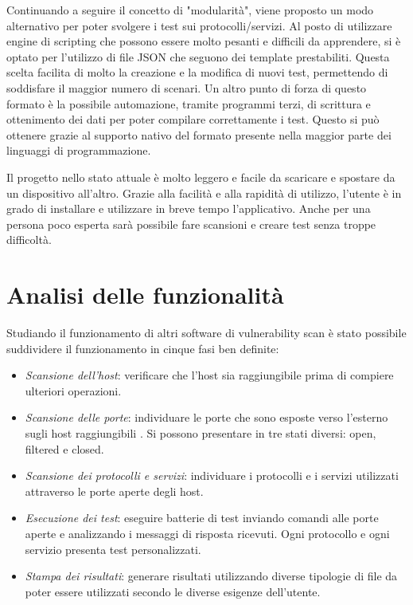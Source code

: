 \documentclass[12pt]{report}
\begin{document}
Continuando a seguire il concetto di "modularità", viene proposto un modo alternativo per poter svolgere i test sui protocolli/servizi. Al posto di utilizzare engine di scripting che possono essere molto pesanti e difficili da apprendere, si è optato per l'utilizzo di file JSON che seguono dei template prestabiliti. Questa scelta facilita di molto la creazione e la modifica di nuovi test, permettendo di soddisfare il maggior numero di scenari. Un altro punto di forza di questo formato è la possibile automazione, tramite programmi terzi, di scrittura e ottenimento dei dati per poter compilare correttamente i test. Questo si può ottenere grazie al supporto nativo del formato presente nella maggior parte dei linguaggi di programmazione.

Il progetto nello stato attuale è molto leggero e facile da scaricare e spostare da un dispositivo all'altro. Grazie alla facilità e alla rapidità di utilizzo, l'utente è in grado di installare e utilizzare in breve tempo l'applicativo. Anche per una persona poco esperta sarà possibile fare scansioni e creare test senza troppe difficoltà.

\section{Analisi delle funzionalità}
\label{sec:analisi}

Studiando il funzionamento di altri software di vulnerability scan è stato possibile suddividere il funzionamento in cinque fasi ben definite:
\begin{itemize}
    \item \textit{Scansione dell'host}: verificare che l'host sia raggiungibile prima di compiere ulteriori operazioni.
    \item \textit{Scansione delle porte}: individuare le porte che sono esposte verso l'esterno sugli host raggiungibili . Si possono presentare in tre stati diversi: open, filtered e closed.
    \item \textit{Scansione dei protocolli e servizi}: individuare i protocolli e i servizi utilizzati attraverso le porte aperte degli host.
    \item \textit{Esecuzione dei test}: eseguire batterie di test inviando comandi alle porte aperte e analizzando i messaggi di risposta ricevuti. Ogni protocollo e ogni servizio presenta test personalizzati. 
    \item \textit{Stampa dei risultati}: generare risultati utilizzando diverse tipologie di file da poter essere utilizzati secondo le diverse esigenze dell'utente.
\end{itemize}
\end{document}
